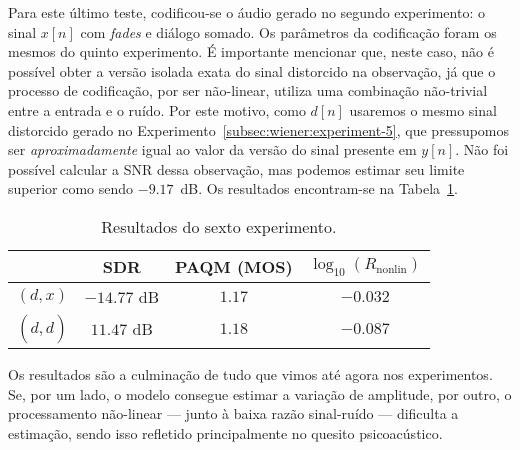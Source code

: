 Para este último teste, codificou-se o áudio gerado no segundo experimento: o sinal $x[n]$ com \textit{fades} e diálogo somado. Os parâmetros da codificação foram os mesmos do quinto experimento. É importante mencionar que, neste caso, não é possível obter a versão isolada exata do sinal distorcido na observação, já que o processo de codificação, por ser não-linear, utiliza uma combinação não-trivial entre a entrada e o ruído. Por este motivo, como $d[n]$ usaremos o mesmo sinal distorcido gerado no Experimento~\ref{subsec:wiener:experiment-5}, que pressupomos ser \emph{aproximadamente} igual ao valor da versão do sinal presente em $y[n]$. Não foi possível calcular a SNR dessa observação, mas podemos estimar seu limite superior como sendo $-9.17$~dB. Os resultados encontram-se na Tabela~\ref{tab:wf:experiment-6}.
{\def\arraystretch{1.25}\tabcolsep=10pt
\begin{table}[!ht]
    \centering
    \caption[Resultados do sexto experimento: \textit{fades} com ruído aditivo e codificação com perdas]{Resultados do sexto experimento.}
    \label{tab:wf:experiment-6}
    \begin{tabular}{cccc}
        \toprule
                         & SDR        & PAQM (MOS)  & $\log_{10}(R_{\text{nonlin}})$ \\
        \midrule
        $(d, x)$       & $-14.77$ dB & $1.17$  & $-0.032$                 \\
        $(d, \hat{d})$ & $11.47$ dB & $1.18$ & $-0.087$                \\ \bottomrule
    \end{tabular}
\end{table}
}

Os resultados são a culminação de tudo que vimos até agora nos experimentos. Se, por um lado, o modelo consegue estimar a variação de amplitude, por outro, o processamento não-linear --- junto à baixa razão sinal-ruído --- dificulta a estimação, sendo isso refletido principalmente no quesito psicoacústico.